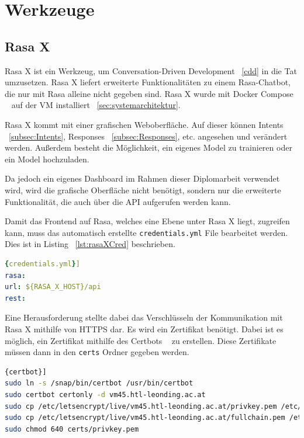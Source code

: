 \section{Werkzeuge}

\subsection{Rasa X}\label{subsec:rasa-x}
Rasa X ist ein Werkzeug, um Conversation-Driven Development ~\ref{cdd} in die Tat umzusetzen.\cite{rasax}
Rasa X liefert erweiterte Funktionalitäten zu einem Rasa-Chatbot, die nur mit Rasa alleine nicht gegeben sind.
Rasa X wurde mit Docker Compose ~\cite{rasaxDocker} auf der VM installiert ~\ref{sec:systemarchitektur}.

Rasa X kommt mit einer grafischen Weboberfläche.
Auf dieser können Intents ~\ref{subsec:Intents}, Responses ~\ref{subsec:Responses}, etc. angesehen und verändert werden.
Außerdem besteht die Möglichkeit, ein eigenes Model zu trainieren oder ein Model hochzuladen.

Da jedoch ein eigenes Dashboard im Rahmen dieser Diplomarbeit verwendet wird, wird die grafische Oberfläche nicht benötigt, sondern nur die erweiterte Funktionalität, die auch über die API aufgerufen werden kann.

Damit das Frontend auf Rasa, welches eine Ebene unter Rasa X liegt, zugreifen kann, muss das automatisch erstellte \texttt{credentials.yml} File bearbeitet werden.
Dies ist in Listing ~\ref{lst:rasaXCred} beschrieben.

\begin{lstlisting}[language=yaml,label={lst:rasaXCred},caption={credentials.yml}]{credentials.yml}]
rasa:
url: ${RASA_X_HOST}/api
rest:
\end{lstlisting}

Eine Herausforderung stellte dabei das Verschlüsseln der Kommunikation mit Rasa X mithilfe von HTTPS dar.
Es wird ein Zertifikat benötigt.
Dabei ist es möglich, ein Zertifikat mithilfe des Certbots ~\cite{certbot} zu erstellen.
Diese Zertifikate müssen dann in den \texttt{certs} Ordner gegeben werden.

\begin{lstlisting}[language=bash,label={lst:certbot},caption={Install certbot and create certificates}]{certbot}]
sudo ln -s /snap/bin/certbot /usr/bin/certbot
sudo certbot certonly -d vm45.htl-leonding.ac.at
sudo cp /etc/letsencrypt/live/vm45.htl-leonding.ac.at/privkey.pem /etc/rasa/certs/
sudo cp /etc/letsencrypt/live/vm45.htl-leonding.ac.at/fullchain.pem /etc/rasa/certs/
sudo chmod 640 certs/privkey.pem
\end{lstlisting}

